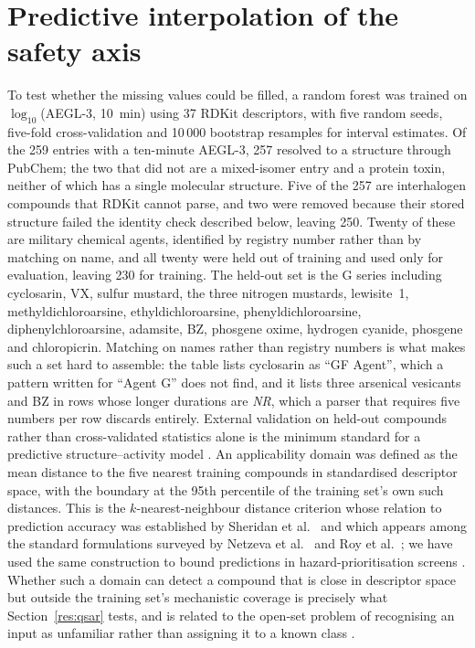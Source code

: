 \documentclass[journal=jacsat,manuscript=suppinfo,margin=1in]{achemso}
\begin{document}
\section{Predictive interpolation of the safety axis}
\label{sec:qsar}
To test whether the missing values could be filled, a random forest was trained
on $\log_{10}$(AEGL-3, 10~min) using 37 RDKit descriptors, with five random seeds,
five-fold cross-validation and 10\,000 bootstrap resamples for interval
estimates. Of the 259 entries with a ten-minute AEGL-3, 257 resolved to a
structure through PubChem; the two that did not are a mixed-isomer entry and a
protein toxin, neither of which has a single molecular structure. Five of the 257
are interhalogen compounds that RDKit cannot parse, and two were removed because
their stored structure failed the identity check described below, leaving 250.
Twenty of these are military chemical agents, identified by registry number
rather than by matching on name, and all twenty were held out of training and
used only for evaluation, leaving 230 for training. The held-out set is the G
series including cyclosarin, VX, sulfur mustard, the three nitrogen mustards,
lewisite~1, methyldichloroarsine, ethyldichloroarsine, phenyldichloroarsine,
diphenylchloroarsine, adamsite, BZ, phosgene oxime, hydrogen cyanide, phosgene
and chloropicrin. Matching on names rather than registry numbers is what makes
such a set hard to assemble: the table lists cyclosarin as ``GF Agent'', which a
pattern written for ``Agent G'' does not find, and it lists three arsenical
vesicants and BZ in rows whose longer durations are \textit{NR}, which a parser
that requires five numbers per row discards entirely. External validation on
held-out compounds rather than cross-validated statistics
alone is the minimum standard for a predictive structure--activity model
\cite{gramatica2007,tropsha2010}. An applicability domain was defined as the
mean distance to the five nearest training compounds in standardised descriptor
space, with the boundary at the 95th percentile of the training set's own such
distances. This is the $k$-nearest-neighbour distance criterion whose relation to
prediction accuracy was established by Sheridan et al.~\cite{sheridan2004} and which appears
among the standard formulations surveyed by Netzeva et al.~\cite{netzeva2005} and
Roy et al.~\cite{roy2015}; we have used the same construction to bound predictions in
hazard-prioritisation screens \cite{dbpcarto}. Whether such a domain can detect
a compound that is close in descriptor space but outside the training set's
mechanistic coverage is precisely what Section~\ref{res:qsar} tests, and is
related to the open-set problem of recognising an input as unfamiliar rather than
assigning it to a known class \cite{openset}.
\end{document}
